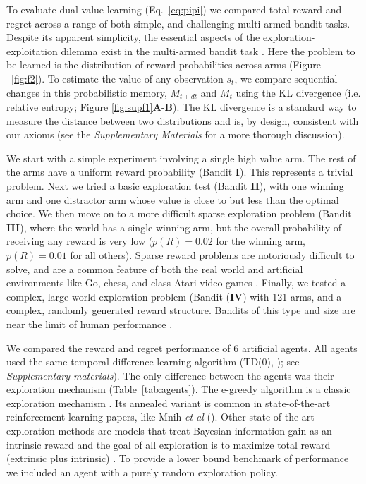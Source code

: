 \documentclass[9pt,twocolumn,twoside]{pnas-new}
\begin{document}
To evaluate dual value learning (Eq.~\ref{eq:pipi}) we compared total reward and regret across a range of both simple, and challenging multi-armed bandit tasks. Despite its apparent simplicity, the essential aspects of the exploration-exploitation dilemma exist in the multi-armed bandit task \cite{Sutton2018}. Here the problem to be learned is the distribution of reward probabilities across arms (Figure ~\ref{fig:f2}).  To estimate the value of any observation $s_t$, we compare sequential changes in this probabilistic memory, $M_{t+dt}$ and $M_t$ using the KL divergence (i.e. relative entropy; Figure \ref{fig:supf1}\textbf{A}-\textbf{B}). The KL divergence is a standard way to measure the distance between two distributions \cite{MacKay2003} and is, by design, consistent with our axioms (see the \textit{Supplementary Materials} for a more thorough discussion). 

We start with a simple experiment involving a single high value arm. The rest of the arms have a uniform reward probability (Bandit \textbf{I}). This represents a trivial problem. Next we tried a basic exploration test (Bandit \textbf{II}), with one winning arm and one distractor arm whose value is close to but less than the optimal choice. We then move on to a more difficult sparse exploration problem (Bandit \textbf{III}), where the world has a single winning arm, but the overall probability of receiving any reward is very low ($p(R) = 0.02$ for the winning arm, $p(R) = 0.01$ for all others). Sparse reward problems are notoriously difficult to solve, and are a common feature of both the real world and artificial environments like Go, chess, and class Atari video games \cite{Mniha,Silver2016b,Silver2018}. Finally, we tested a complex, large world exploration problem (Bandit (\textbf{IV}) with 121 arms, and a complex, randomly generated reward structure. Bandits of this type and size are near the limit of human performance \cite{Wu2018}. 

We compared the reward and regret performance of 6 artificial agents. All agents used the same temporal difference learning algorithm (TD(0), \cite{Sutton2018}); see \textit{Supplementary materials}). The only difference between the agents was their exploration mechanism (Table~\ref{tab:agents}).  The e-greedy algorithm is a classic exploration mechanism \cite{Sutton2018}. Its annealed variant is common in state-of-the-art reinforcement learning papers, like Mnih \emph{et al} (\cite{Mniha}). Other state-of-the-art exploration methods are models that treat Bayesian information gain as an intrinsic reward and the goal of all exploration is to maximize total reward (extrinsic plus intrinsic) \cite{Jaegle2019,Schmidhuber1991}. To provide a lower bound benchmark of performance we included an agent with a purely random exploration policy.
\end{document}
